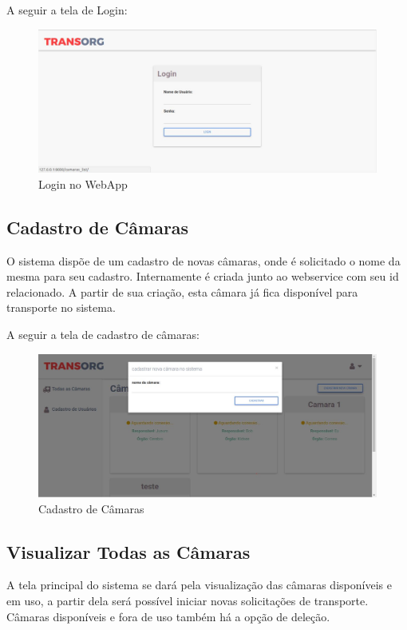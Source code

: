 	A seguir a tela de Login:

\begin{figure}[H]
\centering
\includegraphics[width=16cm]{figuras/login_software.JPG}
\caption{Login no WebApp}
\end{figure}

\subsection{Cadastro de Câmaras}
	O sistema dispõe de um cadastro de novas câmaras, onde é solicitado o nome da mesma para seu cadastro. Internamente é criada junto ao webservice com seu id relacionado. A partir de sua criação, esta câmara já fica disponível para transporte no sistema.
	
	A seguir a tela de cadastro de câmaras:

\begin{figure}[H]
\centering
\includegraphics[width=16cm]{figuras/cadastroCamaras_software.JPG}
\caption{Cadastro de Câmaras}
\end{figure}

\subsection{Visualizar Todas as Câmaras}
	A tela principal do sistema se dará pela visualização das câmaras disponíveis e em uso, a partir dela será possível iniciar novas solicitações de transporte. Câmaras disponíveis e fora de uso também há a opção de deleção.
	
